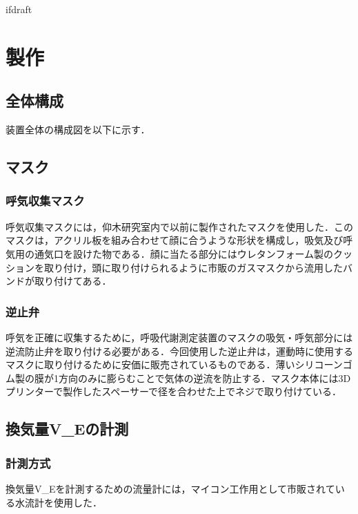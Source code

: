 \expandafter\ifx\csname ifdraft\endcsname\relax
 
\fi

\section{製作}

\subsection{全体構成}

装置全体の構成図を以下に示す．

\subsection{マスク}

\subsubsection{呼気収集マスク}

呼気収集マスクには，仰木研究室内で以前に製作されたマスクを使用した．このマスクは，アクリル板を組み合わせて顔に合うような形状を構成し，吸気及び呼気用の通気口を設けた物である．顔に当たる部分にはウレタンフォーム製のクッションを取り付け，頭に取り付けられるように市販のガスマスクから流用したバンドが取り付けてある．

\subsubsection{逆止弁}

呼気を正確に収集するために，呼吸代謝測定装置のマスクの吸気・呼気部分には逆流防止弁を取り付ける必要がある．今回使用した逆止弁は，運動時に使用するマスクに取り付けるために安価に販売されているものである．薄いシリコーンゴム製の膜が1方向のみに膨らむことで気体の逆流を防止する．マスク本体には3Dプリンターで製作したスペーサーで径を合わせた上でネジで取り付けている．

\subsection{換気量V_Eの計測}

\subsubsection{計測方式}

換気量V_Eを計測するための流量計には，マイコン工作用として市販されている水流計を使用した．

